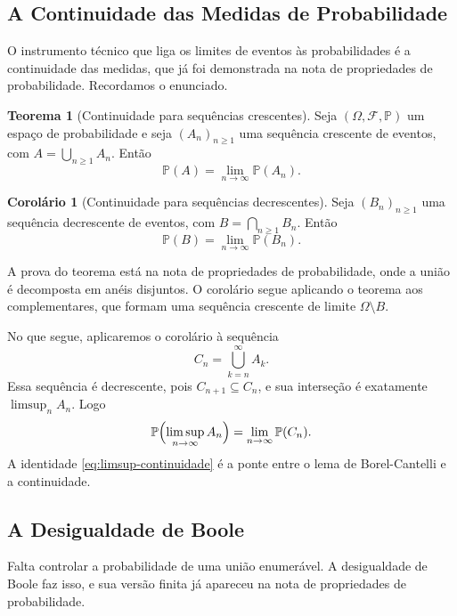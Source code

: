 \documentclass[12pt,portuguese]{article}
\theoremstyle{definition}
\newtheorem{theorem}{Teorema}
\newtheorem{corollary}[corollary]{Corolário}
\theoremstyle{plainexercise}
\theoremstyle{starredexercise}
\theoremstyle{definition}
\begin{document}
\subsection{A Continuidade das Medidas de Probabilidade}\label{subsec:continuidade}

O instrumento técnico que liga os limites de eventos às probabilidades é a
continuidade das medidas, que já foi demonstrada na nota de propriedades de
probabilidade. Recordamos o enunciado.

\begin{theorem}[Continuidade para sequências crescentes]\label{thm:continuidade-crescente}
Seja $(\Omega,\mathcal{F},\mathbb{P})$ um espaço de probabilidade e seja
$(A_n)_{n\geqslant1}$ uma sequência crescente de eventos, com
$A=\bigcup_{n\geqslant1}A_n$. Então
\[
\mathbb{P}(A)=\lim_{n\to\infty}\mathbb{P}(A_n).
\]
\end{theorem}

\begin{corollary}[Continuidade para sequências decrescentes]\label{cor:continuidade-decrescente}
Seja $(B_n)_{n\geqslant1}$ uma sequência decrescente de eventos, com
$B=\bigcap_{n\geqslant1}B_n$. Então
\[
\mathbb{P}(B)=\lim_{n\to\infty}\mathbb{P}(B_n).
\]
\end{corollary}

A prova do teorema está na nota de propriedades de probabilidade, onde a união
é decomposta em anéis disjuntos. O corolário segue aplicando o teorema aos
complementares, que formam uma sequência crescente de limite
$\Omega\setminus B$.

No que segue, aplicaremos o corolário à sequência
\[
C_n=\bigcup_{k=n}^{\infty}A_k.
\]
Essa sequência é decrescente, pois $C_{n+1}\subseteq C_n$, e sua interseção é
exatamente $\limsup_n A_n$. Logo
\begin{equation}\label{eq:limsup-continuidade}
\mathbb{P}\Bigl(\limsup_{n\to\infty}A_n\Bigr)
=
\lim_{n\to\infty}\mathbb{P}(C_n).
\end{equation}
A identidade \eqref{eq:limsup-continuidade} é a ponte entre o lema de
Borel-Cantelli e a continuidade.

\subsection{A Desigualdade de Boole}\label{subsec:boole}

Falta controlar a probabilidade de uma união enumerável. A desigualdade de
Boole faz isso, e sua versão finita já apareceu na nota de propriedades de
probabilidade.
\end{document}
